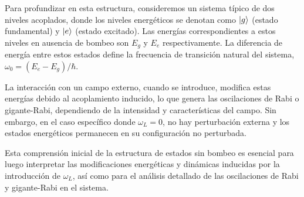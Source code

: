 \documentclass[main.tex]{subfiles}
\begin{document}
Para profundizar en esta estructura, consideremos un sistema típico de dos niveles acoplados, donde los niveles energéticos se denotan como $\ket{g}$ (estado fundamental) y $\ket{e}$ (estado excitado). Las energías correspondientes a estos niveles en ausencia de bombeo son $E_g$ y $E_e$ respectivamente. La diferencia de energía entre estos estados define la frecuencia de transición natural del sistema, $\omega_0 = (E_e-E_g)/\hbar$.

La interacción con un campo externo, cuando se introduce, modifica estas energías debido al acoplamiento inducido, lo que genera las oscilaciones de Rabi o gigante-Rabi, dependiendo de la intensidad y características del campo. Sin embargo, en el caso específico donde $\omega_L=0$, no hay perturbación externa y los estados energéticos permanecen en su configuración no perturbada.

Esta comprensión inicial de la estructura de estados sin bombeo es esencial para luego interpretar las modificaciones energéticas y dinámicas inducidas por la introducción de $\omega_L$, así como para el análisis detallado de las oscilaciones de Rabi y gigante-Rabi en el sistema.
\end{document}
